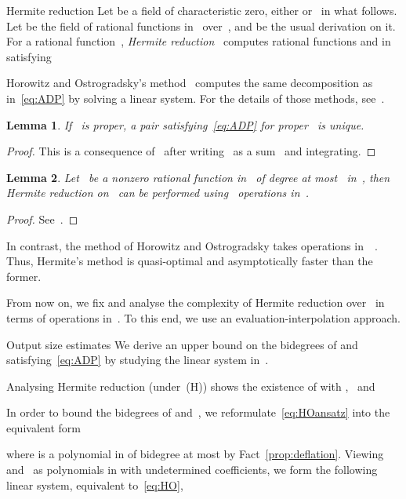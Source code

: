 \documentclass{sig-alt-full}
\newtheorem{lemma}{Lemma}
\begin{document}
\begin{section}{Hermite reduction}\label{sec:Hermite-reduction}
Let  be a field of characteristic zero, either  or~ in
what follows. Let  be the field of rational functions in~
over~, and  be the usual derivation on it. For a rational
function~, \emph{Hermite reduction\/}~\cite{Hermite1872}
computes rational functions  and   in  satisfying

Horowitz and Ostrogradsky's method~\cite{Ostrogradsky1845,
Horowitz1971} computes the same decomposition as in~\eqref{eq:ADP}
by solving a linear system. For the details of those methods,
see~\cite[Chapter 2]{BronsteinBook}.
\begin{lemma}\label{le:unique}
If ~is proper, a pair  satisfying~\eqref{eq:ADP} for
proper~ is unique.
\end{lemma}
\begin{proof}
This is a consequence of~\cite[Theorem~2.10]{Horowitz1971} after
writing~ as a sum~ and integrating.
\end{proof}
\begin{lemma}\label{le:ComplexityUHR}
Let~ be a nonzero rational function in~ of degree at most~ in~,
then Hermite reduction on~ can
be performed using~ operations in~.
\end{lemma}
\begin{proof}
See~\cite[Theorem 22.7]{MCA2003}.
\end{proof}
In contrast, the method of Horowitz and Ostrogradsky takes
 operations in~~\cite[\S\,22.2]{MCA2003}. Thus,
Hermite's method is quasi-optimal and asymptotically faster than the
former.

From now on, we fix  and analyse the complexity
of
Hermite reduction over~ in terms of
operations in~.
To this end, we use an evaluation-interpolation approach.

\begin{subsection}{Output size estimates}
We derive an upper bound on the bidegrees of  and~
satisfying~\eqref{eq:ADP} by studying the linear system
in~\cite{Horowitz1971}.

Analysing Hermite reduction (under~(H))
shows the existence of 
with , ~and

In order to bound the bidegrees of  and~, we
reformulate~\eqref{eq:HOansatz} into the equivalent form

where  is a polynomial in  of bidegree at most  by Fact~\ref{prop:deflation}.
Viewing  and~ as polynomials in  with undetermined
coefficients, we form the following linear system, equivalent to~\eqref{eq:HO},


\end{subsection}
\end{section}
\end{document}
